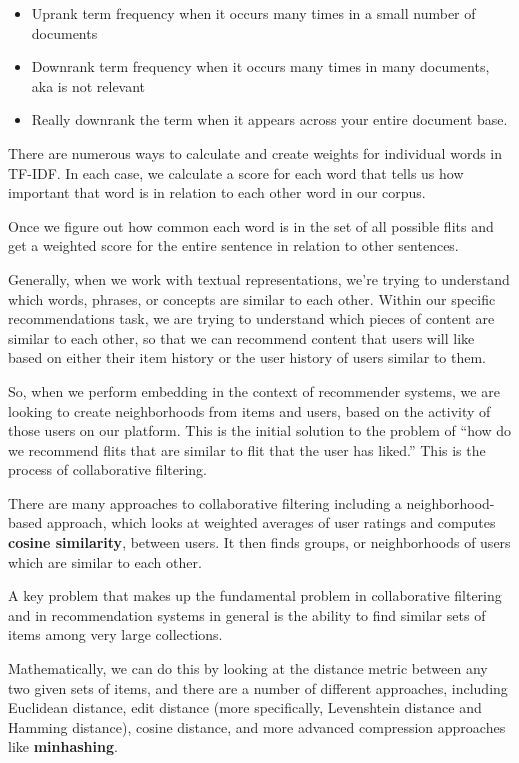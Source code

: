 \documentclass[11pt, table]{diazessay} %
\begin{document}
\begin{sloppypar}
\begin{itemize}
  \item Uprank term frequency when it occurs many times in a small number of documents
  \item Downrank term frequency when it occurs many times in many documents, aka is not relevant
  \item Really downrank the term when it appears across your entire document base\citep{schutze2008introduction}.
\end{itemize}

There are numerous ways to calculate and create weights for individual words in TF-IDF. In each case, we calculate a score for each word that tells us how important that word is in relation to each other word in our corpus.

Once we figure out how common each word is in the set of all possible flits and get a weighted score for the entire sentence in relation to other sentences.

Generally, when we work with textual representations, we’re trying to understand which words, phrases, or concepts are similar to each other. Within our specific recommendations task, we are trying to understand which pieces of content are similar to each other, so that we can recommend content that users will like based on either their item history or the user history of users similar to them.

So, when we perform embedding in the context of recommender systems, we are looking to create neighborhoods from items and users, based on the activity of those users on our platform.  This is the initial solution to the problem of “how do we recommend flits that are similar to flit that the user has liked.” This is the process of collaborative filtering.

There are many approaches to collaborative filtering including a neighborhood-based approach,  which looks at weighted averages of user ratings and computes \textbf{cosine similarity}, between users.  It then finds groups, or neighborhoods of users which are similar to each other.

A key problem that makes up the fundamental problem in collaborative filtering and in recommendation systems in general is the ability to find similar sets of items among very large collections\citep{leskovec2020mining}.

Mathematically, we can do this by looking at the distance metric between any two given sets of items, and there are a number of different approaches, including  Euclidean distance, edit distance (more specifically, Levenshtein distance and Hamming distance), cosine distance, and more advanced compression approaches like \textbf{minhashing}.


\end{sloppypar}
\end{document}
